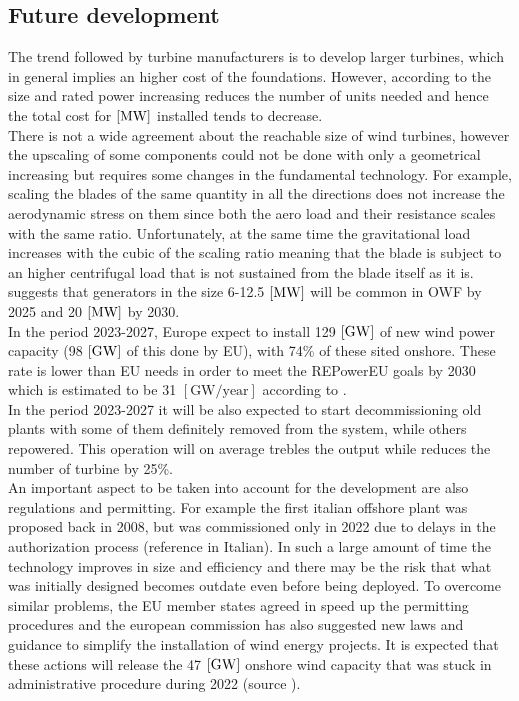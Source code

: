 \subsection{Future development}
The trend followed by turbine manufacturers is to develop larger turbines, which in general implies an higher cost of the foundations. However, according to \cite{current_staus_and_future_trends_of_offshore_wind_power_in_europe} the size and rated power increasing reduces the number of units needed and hence the total cost for $\left[\si{\mega\watt}\right]$ installed tends to decrease.\\
There is not a wide agreement about the reachable size of wind turbines, however the upscaling of some components could not be done with only a geometrical increasing but requires some changes in the fundamental technology. For example, scaling the blades of the same quantity in all the directions does not increase the aerodynamic stress on them since both the aero load and their resistance scales with the same ratio. Unfortunately, at the same time the gravitational load increases with the cubic of the scaling ratio meaning that the blade is subject to an higher centrifugal load that is not sustained from the blade itself as it is. \\
\cite{current_staus_and_future_trends_of_offshore_wind_power_in_europe} suggests that generators in the size 6-12.5 $\left[\si{\mega\watt}\right]$ will be common in OWF by 2025 and 20 $\left[\si{\mega\watt}\right]$ by 2030.\\
In the period 2023-2027, Europe expect to install 129 $\left[\si{\giga\watt}\right]$ of new wind power capacity (98 $\left[\si{\giga\watt}\right]$ of this done by EU), with 74\% of these sited onshore. These rate is lower than EU needs in order to meet the REPowerEU goals by 2030 which is estimated to be 31 $\left[\text{GW/year}\right]$ according to \cite{wind_europe_data_2022}. \\
In the period 2023-2027 it will be also expected to start decommissioning old plants with some of them definitely removed from the system, while others repowered. This operation will on average trebles the output while reduces the number of turbine by 25\%. \\
An important aspect to be taken into account for the development are also regulations and permitting. For example the first italian offshore plant was proposed back in 2008, but was commissioned only in 2022 due to delays in the authorization process \cite{il_post} (reference in Italian). In such a large amount of time the technology improves in size and efficiency and there may be the risk that what was initially designed becomes outdate even before being deployed. To overcome similar problems, the EU member states agreed in speed up the permitting procedures and the european commission has also suggested new laws and guidance to simplify the installation of wind energy projects. It is expected that these actions will release the 47 $\left[\si{\giga\watt}\right]$ onshore wind capacity that was stuck in administrative procedure during 2022 (source \cite{wind_europe_data_2022}).  